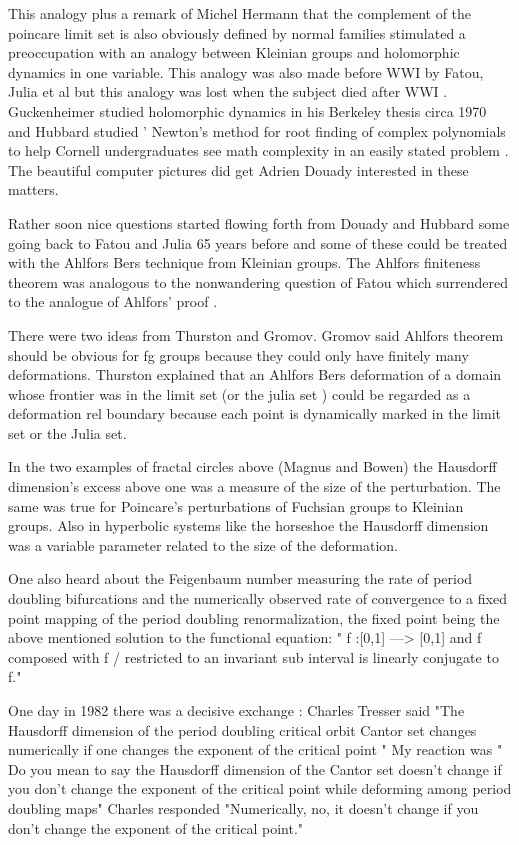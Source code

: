 \begin{description}
This analogy  plus a  remark of Michel Hermann that the complement of the poincare limit set is also obviously defined by normal families  stimulated a preoccupation with  an  analogy between Kleinian groups and holomorphic dynamics in one variable.  This  analogy  was  also made  before WWI by Fatou, Julia  et al  but  this analogy was lost when the subject died after WWI .  Guckenheimer   studied holomorphic dynamics in his Berkeley thesis  circa 1970 and Hubbard studied ' Newton's method for root finding of complex polynomials to help Cornell undergraduates  see math complexity in an easily stated problem . The beautiful computer pictures did get  Adrien Douady interested in these matters.

Rather soon nice questions started flowing forth from Douady and Hubbard  some going back to Fatou and Julia 65 years before  and some of these could be treated with the Ahlfors Bers technique from Kleinian groups. The Ahlfors finiteness theorem was analogous to the nonwandering question of Fatou which surrendered to the analogue of Ahlfors' proof .

 There were two ideas  from Thurston and Gromov.
 Gromov said Ahlfors theorem should be obvious for fg groups because they could only have finitely many deformations.
 Thurston  explained that  an Ahlfors Bers  deformation of a domain whose frontier was in the limit set (or the  julia set ) could be regarded as a deformation rel boundary  because each point is dynamically marked in the limit set or the Julia set.



 In the  two examples of fractal circles  above (Magnus and Bowen) the Hausdorff dimension's excess above one was a measure of the size of the perturbation.  The same was true for  Poincare's perturbations of Fuchsian groups to Kleinian groups.
Also in hyperbolic systems like the horseshoe the Hausdorff dimension was a variable parameter related to the size of the deformation.

  One also  heard about  the  Feigenbaum number  measuring the rate of period doubling bifurcations and the numerically observed rate of convergence to a fixed point mapping of the period doubling renormalization, the fixed point being the above mentioned solution to the functional equation:
" f :[0,1] ---> [0,1]  and f composed with f / restricted to an invariant  sub interval  is linearly conjugate to f."



One day in 1982  there was a decisive exchange :  Charles Tresser said  "The Hausdorff dimension of the period doubling critical orbit Cantor set changes numerically if one changes the exponent of the critical point "  My  reaction was " Do you mean to say  the Hausdorff dimension of the Cantor set doesn't change if you don't change the  exponent of the critical point while deforming among period doubling maps"  Charles  responded "Numerically, no, it doesn't change if you don't change the exponent of the critical point."


\end{description}
